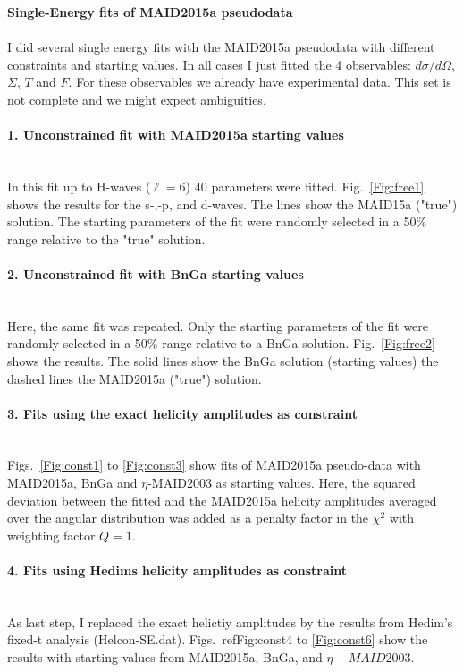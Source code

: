 \documentclass[a4paper,12pt]{report}
\begin{document}
{\LARGE \bf Single-Energy fits of MAID2015a pseudodata}
~\\
~\\

\large
I did several single energy fits with the MAID2015a pseudodata with
different constraints and starting values. In all cases I just fitted
the 4 observables: $d\sigma/d\Omega$, $\Sigma$, $T$ and $F$. For these 
observables we already have experimental data. This set is not complete
and we might expect ambiguities.  
\paragraph{1. Unconstrained fit with MAID2015a starting values} 
~\\
In this fit up to H-waves ($\ell = 6$) 40 parameters were fitted. Fig.~\ref{Fig:free1} shows
the results for the s-,-p, and d-waves. The lines show the MAID15a ("true") solution. 
The starting parameters of the fit were randomly selected in a 50\% range relative to 
the "true" solution.

\paragraph{2. Unconstrained fit with BnGa starting values} 
~\\
Here, the same fit was repeated. Only the starting parameters of the fit were 
randomly selected in a 50\% range relative to a BnGa solution.
Fig.~\ref{Fig:free2} shows the results. The solid lines show the BnGa solution 
(starting values) the dashed lines the MAID2015a ("true") solution. 


\paragraph{3. Fits using the exact helicity amplitudes as constraint}
~\\
Figs.~\ref{Fig:const1} to \ref{Fig:const3} show fits of MAID2015a pseudo-data
with MAID2015a, BnGa and $\eta$-MAID2003
as starting values. Here, the squared deviation between the fitted and the MAID2015a 
helicity amplitudes averaged over the angular distribution 
was added as a penalty factor in the $\chi^2$ with weighting factor $Q = 1$.

\paragraph{4. Fits using Hedims helicity amplitudes as constraint}
~\\
As last step, I replaced the exact helictiy amplitudes by the results from 
Hedim's fixed-t analysis (Helcon-SE.dat). Figs.~ref{Fig:const4} to \ref{Fig:const6} 
show the results with starting values from MAID2015a, BnGa, and $\eta-MAID2003$.
\end{document}
